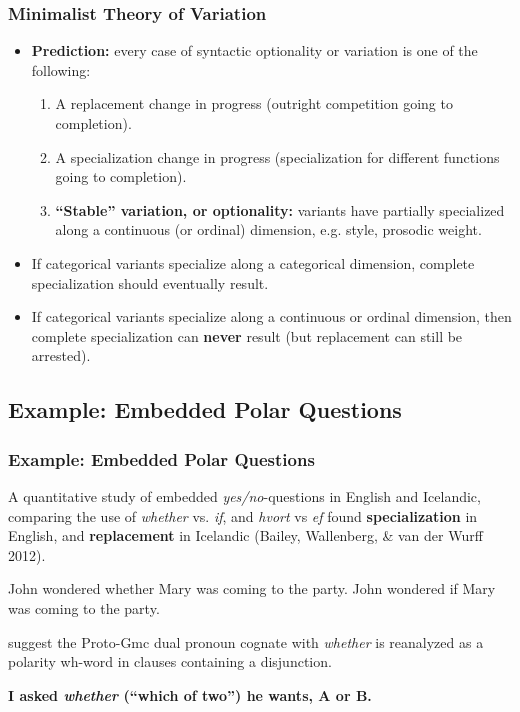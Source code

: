 \documentclass[hyperref={pdfpagelabels=false}]{beamer}
\begin{document}
\begin{frame}
\frametitle{Minimalist Theory of Variation}
\begin{itemize}
	\item \textbf{Prediction:} every case of syntactic optionality or variation is one of the following:
		\begin{enumerate}
			\item A replacement change in progress (outright competition going to completion).
			\item A specialization change in progress (specialization for different functions going to completion).
			\item \textbf{``Stable'' variation, or optionality:} variants have partially specialized along a continuous (or ordinal) dimension, e.g. style, prosodic weight. 
		\end{enumerate}
	\item If categorical variants specialize along a categorical dimension, complete specialization should eventually result.
	\item If categorical variants specialize along a continuous or ordinal dimension, then complete specialization can \textbf{never} result (but replacement can still be arrested).
\end{itemize}

\end{frame}

\subsection{Example: Embedded Polar Questions}

\begin{frame}
\frametitle{Example: Embedded Polar Questions}
A quantitative study of embedded \textsl{yes/no}-questions in English and Icelandic, comparing the use of \textsl{whether} vs. \textsl{if}, and \textsl{hvort} vs \textsl{ef} found \textbf{specialization} in English, and \textbf{replacement} in Icelandic (Bailey, Wallenberg, \& van der Wurff 2012). \nocite{baileywallenbergwurff2012}\\
	\begin{exe}
		\ex John wondered whether Mary was coming to the party.
		\ex John wondered if Mary was coming to the party.
	\end{exe}
\citet{baileywallenbergwurff2012} suggest the Proto-Gmc dual pronoun cognate with \textsl{whether} is reanalyzed as a polarity wh-word in clauses containing a disjunction.
\begin{center}
 \textbf{I asked \textsl{whether} (``which of two'') he wants, A or B.}%
\end{center}
\end{frame}
\end{document}
